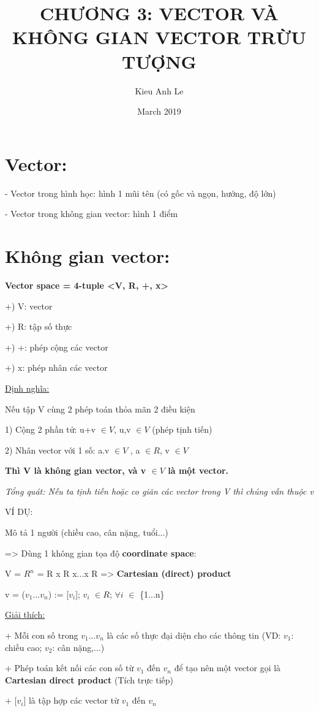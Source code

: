 \documentclass{article}
\title{CHƯƠNG 3: VECTOR VÀ KHÔNG GIAN VECTOR TRỪU TƯỢNG}
\author{Kieu Anh Le }
\date{March 2019}
\begin{document}
\maketitle

\section{Vector:}
- Vector trong hình học: hình 1 mũi tên (có gốc và ngọn, hướng, độ lớn)

- Vector trong không gian vector: hình 1 điểm
   
\section{Không gian vector:} 
\textbf{Vector space = 4-tuple <V, R, +, x>}

+) V: vector

+) R: tập số thực

+) +: phép cộng các vector

+) x: phép nhân các vector

\underline{Định nghĩa:}

Nếu tập V cùng 2 phép toán thỏa mãn 2 điều kiện

1) Cộng 2 phần tử: u+v $\in V $, u,v $\in V$ (phép tịnh tiến)

2) Nhân vector với 1 số: a.v $\in V $ , a $\in  R $, v $\in V $

\textbf{Thì V là không gian vector, và v $\in V $ là một vector.}

\emph{Tổng quát: Nếu ta tịnh tiến hoặc co giãn các vector trong V thì chúng vẫn thuộc v}


\large{VÍ DỤ:}

Mô tả 1 người (chiều cao, cân nặng, tuổi...)

=> Dùng 1 không gian tọa độ \textbf{coordinate space}:

V = $R^{n}$ = R x R x...x R => \textbf{Cartesian (direct) product}

v = ($v_{1}$...$v_{n}$) := [$v_{i}$]; $v_{i}$ $\in R$; $\forall i$ $\in$
{\{1...n}\}

\underline{Giải thích:}

+ Mỗi con số trong $v_{1}$...$v_{n}$ là các số thực đại diện cho các thông tin (VD: $v_{1}$: chiều cao; $v_{2}$: cân nặng,...)

+ Phép toán kết nối các con số từ $v_{1}$ đến $v_{n}$ để tạo nên một vector gọi là \textbf{Cartesian direct product} (Tích trực tiếp)

+ [$v_{i}$] là tập hợp các vector từ $v_{1}$ đến $v_{n}$
\end{document}
